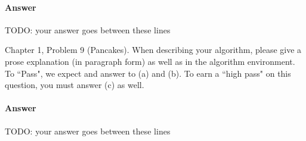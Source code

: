 \documentclass{article}
\begin{document}
\paragraph{Answer}


TODO: your answer goes between these lines



\nextprob
{}

Chapter 1, Problem 9 (Pancakes). When describing your algorithm, please give a
prose explanation (in paragraph form) as well as in the algorithm environment.
To ``Pass", we expect and answer to (a) and (b).  To earn a ``high pass" on this
question, you must answer (c) as well.

\paragraph{Answer}


TODO: your answer goes between these lines

\end{document}

